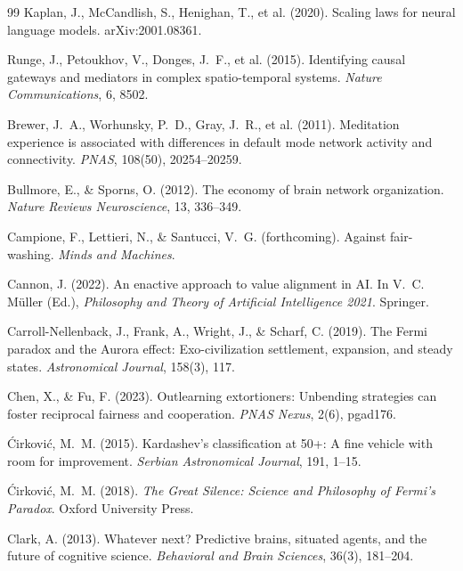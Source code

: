 \documentclass[11pt,a4paper,twocolumn]{article}
\begin{document}
\begin{thebibliography}{99}
 Kaplan, J., McCandlish, S., Henighan, T., et al. (2020). Scaling laws for neural language models. arXiv:2001.08361.

 Runge, J., Petoukhov, V., Donges, J.~F., et al. (2015). Identifying causal gateways and mediators in complex spatio-temporal systems. \textit{Nature Communications}, 6, 8502.

 Brewer, J.~A., Worhunsky, P.~D., Gray, J.~R., et al. (2011). Meditation experience is associated with differences in default mode network activity and connectivity. \textit{PNAS}, 108(50), 20254--20259.

 Bullmore, E., \& Sporns, O. (2012). The economy of brain network organization. \textit{Nature Reviews Neuroscience}, 13, 336--349.

 Campione, F., Lettieri, N., \& Santucci, V.~G. (forthcoming). Against fair-washing. \textit{Minds and Machines}.

 Cannon, J. (2022). An enactive approach to value alignment in AI. In V.~C. M\"uller (Ed.), \textit{Philosophy and Theory of Artificial Intelligence 2021}. Springer.

 Carroll-Nellenback, J., Frank, A., Wright, J., \& Scharf, C. (2019). The Fermi paradox and the Aurora effect: Exo-civilization settlement, expansion, and steady states. \textit{Astronomical Journal}, 158(3), 117.

 Chen, X., \& Fu, F. (2023). Outlearning extortioners: Unbending strategies can foster reciprocal fairness and cooperation. \textit{PNAS Nexus}, 2(6), pgad176.

 \'{C}irkovi\'{c}, M.~M. (2015). Kardashev's classification at 50+: A fine vehicle with room for improvement. \textit{Serbian Astronomical Journal}, 191, 1--15.

 \'{C}irkovi\'{c}, M.~M. (2018). \textit{The Great Silence: Science and Philosophy of Fermi's Paradox}. Oxford University Press.

 Clark, A. (2013). Whatever next? Predictive brains, situated agents, and the future of cognitive science. \textit{Behavioral and Brain Sciences}, 36(3), 181--204.


\end{thebibliography}
\end{document}
